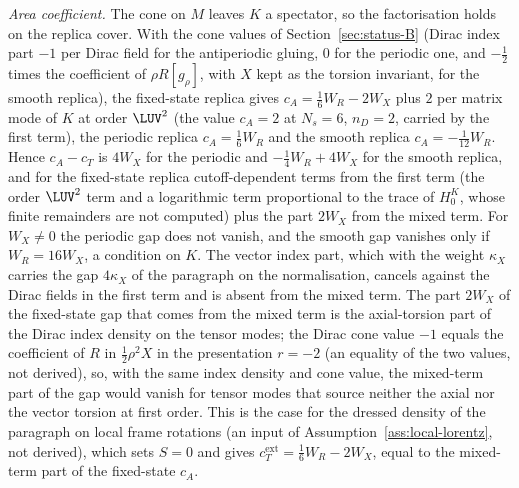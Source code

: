 \emph{Area coefficient.} The cone on \(M\) leaves \(K\) a spectator, so the factorisation holds on the replica cover. With the cone values of Section~\ref{sec:status-B} (Dirac index part \(-1\) per Dirac field for the antiperiodic gluing, \(0\) for the periodic one, and \(-\tfrac12\) times the coefficient of \(\rho R[g_\rho]\), with \(X\) kept as the torsion invariant, for the smooth replica), the fixed-state replica gives \(c_A=\tfrac16W_R-2W_X\) plus \(2\) per matrix mode of \(K\) at order \(\LUV^2\) (the value \(c_A=2\) at \(N_s=6\), \(n_D=2\), carried by the first term), the periodic replica \(c_A=\tfrac16W_R\) and the smooth replica \(c_A=-\tfrac1{12}W_R\). Hence \(c_A-c_T\) is \(4W_X\) for the periodic and \(-\tfrac14W_R+4W_X\) for the smooth replica, and for the fixed-state replica cutoff-dependent terms from the first term (the order \(\LUV^2\) term and a logarithmic term proportional to the trace of \(H_0^K\), whose finite remainders are not computed) plus the part \(2W_X\) from the mixed term. For \(W_X\neq0\) the periodic gap does not vanish, and the smooth gap vanishes only if \(W_R=16W_X\), a condition on \(K\). The vector index part, which with the weight \(\kappa_X\) carries the gap \(4\kappa_X\) of the paragraph on the normalisation, cancels against the Dirac fields in the first term and is absent from the mixed term. The part \(2W_X\) of the fixed-state gap that comes from the mixed term is the axial-torsion part of the Dirac index density on the tensor modes; the Dirac cone value \(-1\) equals the coefficient of \(R\) in \(\tfrac12\rho^2X\) in the presentation \(r=-2\) (an equality of the two values, not derived), so, with the same index density and cone value, the mixed-term part of the gap would vanish for tensor modes that source neither the axial nor the vector torsion at first order. This is the case for the dressed density of the paragraph on local frame rotations (an input of Assumption~\ref{ass:local-lorentz}, not derived), which sets \(S=0\) and gives \(c_T^{\mathrm{ext}}=\tfrac16W_R-2W_X\), equal to the mixed-term part of the fixed-state \(c_A\).

